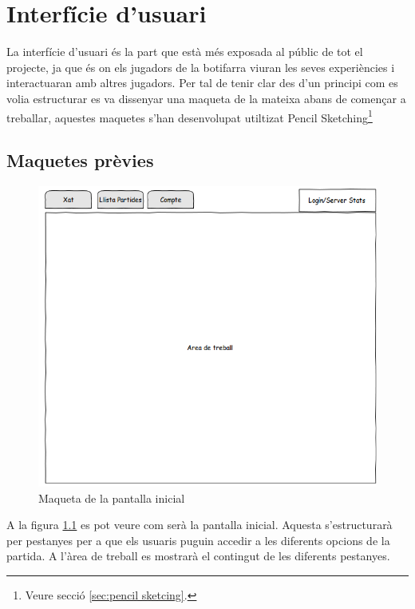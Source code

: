 \chapter{Interfície d'usuari}
\label{chap:interficie_usuari}

La interfície d'usuari és la part que està més exposada al públic de tot el projecte, ja que és on els jugadors de la botifarra viuran les seves experiències i interactuaran amb altres jugadors. Per tal de tenir clar des d'un principi com es volia estructurar es va dissenyar una maqueta de la mateixa abans de començar a treballar, aquestes maquetes s'han desenvolupat utiltizat Pencil Sketching\footnote{Veure secció \ref{sec:pencil sketcing}.}

\section{Maquetes prèvies}

\begin{figure}[htbp]
\centering\includegraphics[width=14cm]{img/Inici.png}
\caption{Maqueta de la pantalla inicial}
\label{fig:mookup-inici}
\end{figure} 

A la figura \ref{fig:mookup-inici} es pot veure com serà la pantalla inicial. Aquesta s'estructurarà per pestanyes per a que els usuaris puguin accedir a les diferents opcions de la partida. A l'àrea de treball es mostrarà el contingut de les diferents pestanyes. 

